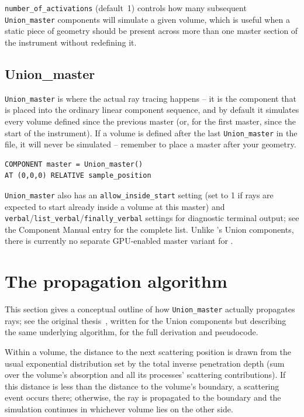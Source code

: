 \texttt{number\_of\_activations} (default~1) controls how many subsequent
\texttt{Union\_master} components will simulate a given volume, which is
useful when a static piece of geometry should be present across more than
one master section of the instrument without redefining it.

\subsection{Union\_master}
\label{sec:union-master}

\texttt{Union\_master} is where the actual ray tracing happens -- it is the
component that is placed into the ordinary linear \MCX component sequence,
and by default it simulates every volume defined since the previous master
(or, for the first master, since the start of the instrument). If a volume is
defined after the last \texttt{Union\_master} in the file, it will never
be simulated -- remember to place a master after your geometry.
\begin{lstlisting}
COMPONENT master = Union_master()
AT (0,0,0) RELATIVE sample_position
\end{lstlisting}
\texttt{Union\_master} also has an \texttt{allow\_inside\_start} setting
(set to 1 if rays are expected to start already inside a volume at this
master) and \texttt{verbal}/\texttt{list\_verbal}/\texttt{finally\_verbal}
settings for diagnostic terminal output; see the Component Manual entry for
the complete list. Unlike \MCS's Union components, there is currently no
separate GPU-enabled master variant for \MCX.

\section{The propagation algorithm}
\label{sec:union-algorithm}

This section gives a conceptual outline of how \texttt{Union\_master}
actually propagates rays; see the original thesis~\cite{union_thesis},
written for the \MCS Union components but describing the same underlying
algorithm, for the full derivation and pseudocode.

Within a volume, the distance to the next scattering position is drawn
from the usual exponential distribution set by the total inverse
penetration depth (sum over the volume's absorption and all its
processes' scattering contributions). If this distance is less than the
distance to the volume's boundary, a scattering event occurs there;
otherwise, the ray is propagated to the boundary and the simulation
continues in whichever volume lies on the other side.


